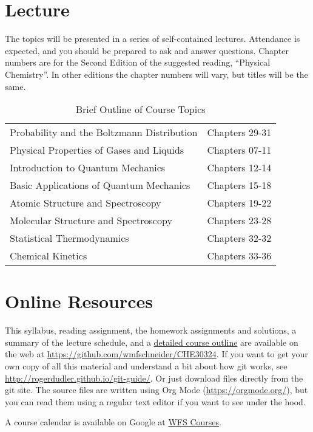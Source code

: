 \documentclass[11pt]{article}
\begin{document}
\section{Lecture}
\label{sec:orgd9e8105}
The topics will be presented in a series of self-contained lectures. Attendance is expected, and you should be prepared to ask and answer questions. Chapter numbers are for the Second Edition of the suggested reading, ``Physical Chemistry''. In other editions the chapter numbers will vary, but titles will be the same. 

\begin{table}[htbp]
\caption{Brief Outline of Course Topics}
\centering
\begin{tabular}{ll}
\hline
Probability and the Boltzmann Distribution & Chapters 29-31\\
Physical Properties of Gases and Liquids & Chapters 07-11\\
Introduction to Quantum Mechanics & Chapters 12-14\\
Basic Applications of Quantum Mechanics & Chapters 15-18\\
Atomic Structure and Spectroscopy & Chapters 19-22\\
Molecular Structure and Spectroscopy & Chapters 23-28\\
Statistical Thermodynamics & Chapters 32-32\\
Chemical Kinetics & Chapters 33-36\\
\hline
\end{tabular}
\end{table}
\section{Online Resources}
\label{sec:orgb61ebec}
This syllabus, reading assignment, the homework assignments and solutions, a summary of the lecture schedule, and a \href{https://github.com/wmfschneider/CHE30324/tree/master/Outline/CHE30324-outline.pdf}{detailed course outline} are available on the web at \url{https://github.com/wmfschneider/CHE30324}.  If you want to get your own copy of all this material and understand a bit about how git works, see \url{http://rogerdudler.github.io/git-guide/}.  Or just download files directly from the git site. The source files are written using Org Mode (\url{https://orgmode.org/}), but you can read them using a regular text editor if you want to see under the hood.

A course calendar is available on Google at \href{https://calendar.google.com/calendar/b/1?cid=NWJwN2pmMjI5bTdoYmFvM2R0cXM2NjYzOThAZ3JvdXAuY2FsZW5kYXIuZ29vZ2xlLmNvbQ}{WFS Courses}.
\end{document}
